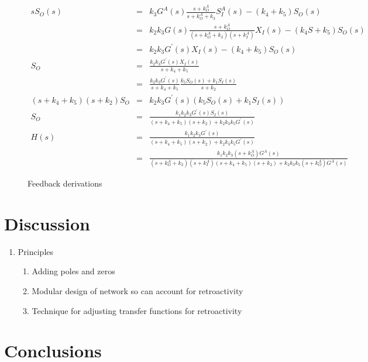 \documentclass[unnumsec,webpdf,contemporary,large]{oup-authoring-template}%
\theoremstyle{thmstyleone}%
\theoremstyle{thmstyletwo}%
\theoremstyle{thmstylethree}%
\begin{document}
\begin{figure}
\begin{eqnarray}
s S_O (s) & = & k_3   G^A(s) \frac{s + k^A_O}{ s + k^A_O + k_3}  S^A_I(s) - (k_4  + k_5) S_O (s) \nonumber \\
& = &
  k_2 k_3  G(s) \frac{s + k^A_O}{(s + k^A_O + k_3)(s + k^A_I)} X_I(s)
   -(k_4 S + k_5 )S_O (s) \nonumber \\
& = &
k_2 k_3  G^{\prime}(s)X_I(s) - (k_4 + k_5) S_O(s)  \nonumber \\
S_O & = &  \frac{k_2 k_3  G^{\prime}(s) X_I(s)}{s + k_4 + k_5  }  \nonumber \\
    & = &  \frac{k_2 k_3  G^{\prime}(s)}{s + k_4 + k_5  } \frac{k_5 S_O(s) + k_1 S_I (s)}{s + k_2} \nonumber \\
(s + k_4 + k_5)(s + k_2)S_O & = &
   k_2 k_3  G^{\prime}(s) (k_5 S_O(s) + k_1 S_I(s))
    \nonumber \\
S_O & = &  \frac{k_1 k_2 k_3  G^{\prime}(s) S_I(s)}{(s + k_4 + k_5)(s + k_2) + k_2 k_3 k_5 G^{\prime}(s)} \nonumber \nonumber \\
H(s) & = & \frac{k_1 k_2 k_3  G^{\prime}(s)}{(s + k_4 + k_5)(s + k_2) + k_2 k_3 k_5 G^{\prime}(s)} \nonumber \\
    & = & \frac{k_1 k_2 k_3  (s + k^A_O) G^A(s)}{(s + k^A_O + k_3)(s + k^A_I)(s + k_4 + k_5)(s + k_2) + k_2 k_3 k_5 (s + k^A_O)G^A(s)}
\end{eqnarray}
\caption{Feedback derivations}\label{fig:feedback-derivation}
\end{figure}

\section{Discussion}\label{discussion}
\begin{enumerate}

\item
Principles
\begin{enumerate}
\item 
Adding poles and zeros
\item
Modular design of network so can account for retroactivity
\item
Technique for adjusting transfer functions for retroactivity
\end{enumerate}

\end{enumerate}

\section{Conclusions}
\end{document}
